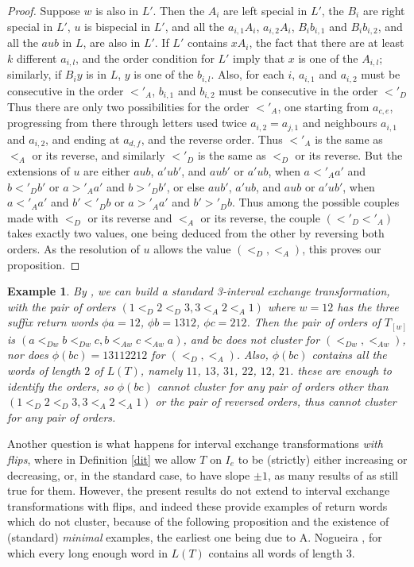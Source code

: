 \documentclass[12pt,a4paper]{amsart}
\newtheorem{example}{Example}
\begin{document}
\begin{proof}
Suppose $w$ is also in $L'$. Then the $A_i$ are left special in $L'$, the $B_i$ are right special in $L'$, $u$ is bispecial in $L'$, and all the $a_{i,1}A_i$, $a_{i,2}A_i$, $B_ib_{i,1}$ and $B_ib_{i,2}$, and all the $aub$ in $L$, are also in $L'$. If $L'$ contains $xA_i$, the fact that there are   at least $k$ different  $a_{i,l}$, and the order condition for $L'$ imply that $x$ is one of the $A_{i,l}$; similarly, if $B_iy$ is in $L$, $y$ is one of the $b_{i,l}$.
 Also, for each $i$, $a_{i,1}$ and $a_{i,2}$ must be consecutive in  the order $<'_A$, $b_{i,1}$ and $b_{i,2}$ must be consecutive in the order $<'_D$ Thus there are only two possibilities for the order $<'_A$, one starting from $a_{c,e}$, progressing from there through letters used twice $a_{i,2}= a_{j,1}$ and neighbours  $a_{i,1}$ and $a_{i,2}$, and ending at 
$a_{d,f}$, and the reverse order. Thus $<'_A$ is the same as $<_A$ or its reverse, and similarly $<'_D$ is the same as $<_D$ or its reverse. But the extensions of $u$ are either $aub$, $a'ub'$,  and $aub'$ or $a'ub$, when $a<'_A a'$ and $b<'_D b'$ or $a>'_A a'$ and $b>'_D b'$, or else $aub'$, $a'ub$, and $aub$ or $a'ub'$, when $a<'_A a'$ and $b'<'_D b$ or $a>'_A a'$ and $b'>'_D b$. Thus  among the possible couples made with $<_D$ or its reverse and $<_A$ or its reverse, the couple $(<'_D <'_A)$ takes exactly  two values, one being deduced from the other by reversing both orders. As the resolution of $u$ allows the value $(<_D,<_A)$, 
this proves our proposition. \end{proof}

\begin{example}\label{e3} By \cite{fhz3}, we can build a standard 3-interval exchange transformation, with the pair of orders $(1<_D 2<_D 3,3<_A 2<_A 1)$ where $w=12$ has the three suffix return words $\phi a=12$, $\phi b=1312$, $\phi c=212$. Then the pair of orders of $T_{[w]}$ is
$(a<_{Dw} b <_{Dw} c, b <_{Aw} c<_{Aw} a) $, and $bc$ does not cluster for $(<_{Dw}, <_{Aw})$, nor does $\phi (bc)=13112212$ for $(<_D, <_A)$. Also, $\phi(bc)$ contains all the words of length $2$ of $L(T)$, namely $11$, $13$, $31$, $22$, $12$, $21$. these are enough to identify the orders, so $\phi (bc)$ cannot cluster for any pair of  orders other than  $(1<_D 2<_D 3, 3<_A 2<_A 1)$ or the pair of reversed orders, thus cannot cluster for any pair of orders. \end{example}

Another question is what happens for interval exchange transformations {\it with flips},  where in Definition \ref{dit} we allow $T$ on $I_e$ to be (strictly) either increasing or decreasing, or, in the standard case, to have slope $\pm 1$, as  many results of \cite{fhuz} as still true for them. However, the present results do not extend to interval exchange transformations with flips, and indeed these provide examples of return words which do not cluster, because of the following proposition and the existence of (standard) {\it minimal} examples, the earliest one being due to A. Nogueira \cite{nog}, for which every long enough word in $L(T)$ contains all words of length $3$. 
\end{document}
